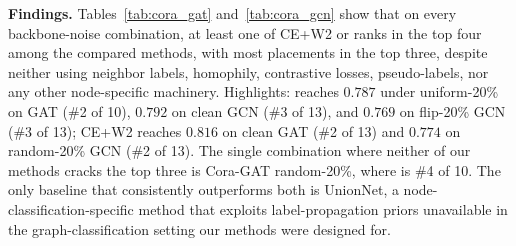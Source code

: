 \begin{table}[ht]
\centering
\caption{Cora node classification, GCN backbone. Each cell is test accuracy (mean over 3 runs). Best per column is bold; our methods are highlighted in gray.}
\label{tab:cora_gcn}
\renewcommand{\arraystretch}{1.05}
\end{table}

\textbf{Findings.} Tables~\ref{tab:cora_gat} and~\ref{tab:cora_gcn} show that on every backbone-noise combination, at least one of CE+W2 or \method{} ranks in the top four among the compared methods, with most placements in the top three, despite neither using neighbor labels, homophily, contrastive losses, pseudo-labels, nor any other node-specific machinery. Highlights: \method{} reaches $0.787$ under uniform-20\% on GAT (\#2 of 10), $0.792$ on clean GCN (\#3 of 13), and $0.769$ on flip-20\% GCN (\#3 of 13); CE+W2 reaches $0.816$ on clean GAT (\#2 of 13) and $0.774$ on random-20\% GCN (\#2 of 13). The single combination where neither of our methods cracks the top three is Cora-GAT random-20\%, where \method{} is \#4 of 10. The only baseline that consistently outperforms both is UnionNet, a node-classification-specific method that exploits label-propagation priors unavailable in the graph-classification setting our methods were designed for.


